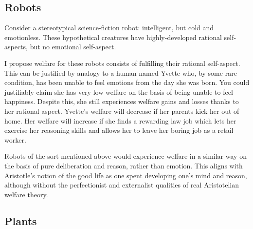 \documentclass{article}
\begin{document}
\subsection{Robots}

Consider a stereotypical science-fiction robot: intelligent, but cold and emotionless. These hypothetical creatures have highly-developed rational self-aspects, but no emotional self-aspect.

I propose welfare for these robots consists of fulfilling their rational self-aspect. This can be justified by analogy to a human named Yvette who, by some rare condition, has been unable to feel emotions from the day she was born. You could justifiably claim she has very low welfare on the basis of being unable to feel happiness. Despite this, she still experiences welfare gains and losses thanks to her rational aspect. Yvette's welfare will decrease if her parents kick her out of home. Her welfare will increase if she finds a rewarding law job which lets her exercise her reasoning skills and allows her to leave her boring job as a retail worker. 

Robots of the sort mentioned above would experience welfare in a similar way \textemdash{} on the basis of pure deliberation and reason, rather than emotion. This aligns with Aristotle's notion of the good life as one spent developing one's mind and reason, although without the perfectionist and externalist qualities of real Aristotelian welfare theory.

\subsection{Plants}







\end{document}
